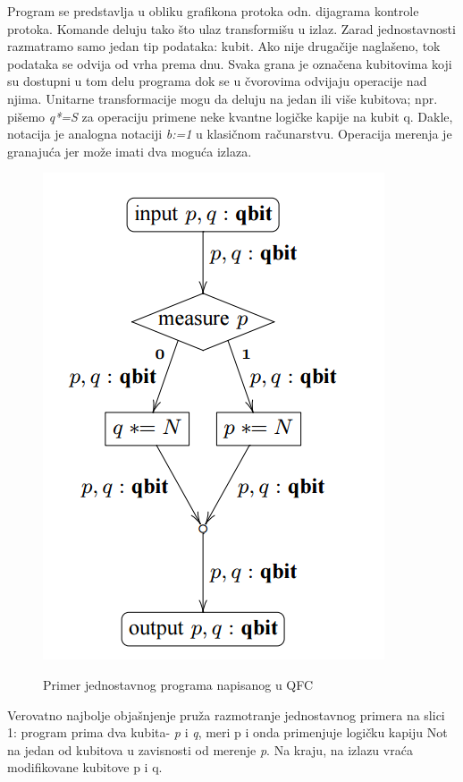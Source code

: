\documentclass[a4paper]{article}
\begin{document}
{Program se predstavlja u obliku grafikona protoka odn. dijagrama kontrole protoka. Komande deluju tako što ulaz transformišu u izlaz. Zarad jednostavnosti razmatramo samo jedan tip podataka: kubit. Ako nije drugačije naglašeno, tok podataka se odvija od vrha prema dnu. Svaka grana je označena kubitovima koji su dostupni u tom delu programa dok se u čvorovima odvijaju operacije nad njima. Unitarne transformacije mogu da deluju na jedan ili više kubitova; npr. pišemo \textit{q*=S} za operaciju primene neke kvantne logičke kapije na kubit q. Dakle, notacija je analogna notaciji \textit{b:=1} u klasičnom računarstvu. Operacija merenja je granajuća jer može imati dva moguća izlaza.
\begin{figure}[H]
\caption{Primer jednostavnog programa napisanog u QFC} 
\centering
\includegraphics[scale=0.75]{qFlow}
\label{fig:qfcPrimer}
\end{figure}
Verovatno najbolje objašnjenje pruža razmotranje jednostavnog primera na slici 1: program prima dva kubita- \textit{p} i \textit{q}, meri p i onda primenjuje logičku kapiju Not na jedan od kubitova u zavisnosti od merenje \textit{p}. Na kraju, na izlazu vraća modifikovane kubitove p i q.

}
\end{document}
